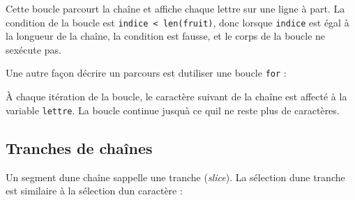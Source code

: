 \begin{Shaded}
\begin{Highlighting}[]
\OperatorTok{=} 
\OperatorTok{\textless{}} 
\OperatorTok{=}
\OperatorTok{=}\OperatorTok{+} 
\end{Highlighting}
\end{Shaded}

Cette boucle parcourt la chaîne et affiche chaque lettre sur une ligne à
part. La condition de la boucle est
\texttt{indice\ \textless{}\ len(fruit)}, donc lorsque \texttt{indice}
est égal à la longueur de la chaîne, la condition est fausse, et le
corps de la boucle ne s\textquotesingle exécute pas.

Une autre façon d\textquotesingle écrire un parcours est
d\textquotesingle utiliser une boucle \texttt{for} :

\begin{Shaded}
\begin{Highlighting}[]
\end{Highlighting}
\end{Shaded}

À chaque itération de la boucle, le caractère suivant de la chaîne est
affecté à la variable \texttt{lettre}. La boucle continue
jusqu\textquotesingle à ce qu\textquotesingle il ne reste plus de
caractères.

\hypertarget{tranches-de-chauxeenes}{%
\subsection{Tranches de chaînes}\label{tranches-de-chauxeenes}}

Un segment d\textquotesingle une chaîne s\textquotesingle appelle une
tranche (\emph{slice}). La sélection d\textquotesingle une tranche est
similaire à la sélection d\textquotesingle un caractère :

\begin{Shaded}
\begin{Highlighting}[]
\OperatorTok{\textgreater{}\textgreater{}\textgreater{}}\OperatorTok{=} 
\OperatorTok{\textgreater{}\textgreater{}\textgreater{}}\NormalTok{ s[}\NormalTok{:}\NormalTok{]}
\OperatorTok{\textgreater{}\textgreater{}\textgreater{}}\NormalTok{ s[}\NormalTok{:}\NormalTok{]}
\end{Highlighting}
\end{Shaded}

